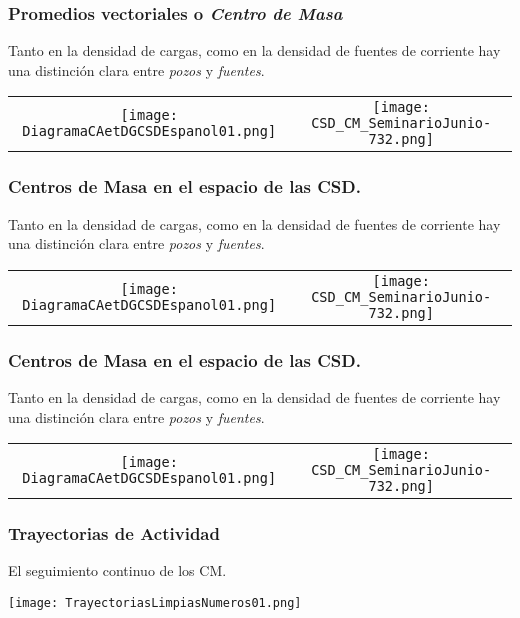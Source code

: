 \documentclass{beamer}
\begin{document}
\begin{frame}
\frametitle{Promedios vectoriales o \emph{Centro de Masa}} 
Tanto en la densidad de cargas, como en la densidad de fuentes de corriente
hay una distinción clara entre \emph{pozos} y \emph{fuentes}.
\begin{center}
  \begin{tabular}{cc}
    \texttt{[image: DiagramaCAetDGCSDEspanol01.png]}   &
    \texttt{[image: CSD\_CM\_SeminarioJunio-732.png]}
  \end{tabular}
\end{center}  
\end{frame}


\begin{frame}
\frametitle{Centros de Masa en el espacio de las CSD.} 
Tanto en la densidad de cargas, como en la densidad de fuentes de corriente
hay una distinción clara entre \emph{pozos} y \emph{fuentes}.
\begin{center}
  \begin{tabular}{cc}
    \texttt{[image: DiagramaCAetDGCSDEspanol01.png]}   &
    \texttt{[image: CSD\_CM\_SeminarioJunio-732.png]}
  \end{tabular}
\end{center}  
\end{frame}


\begin{frame}
\frametitle{Centros de Masa en el espacio de las CSD.} 
Tanto en la densidad de cargas, como en la densidad de fuentes de corriente
hay una distinción clara entre \emph{pozos} y \emph{fuentes}.
\begin{center}
  \begin{tabular}{cc}
    \texttt{[image: DiagramaCAetDGCSDEspanol01.png]}   &
    \texttt{[image: CSD\_CM\_SeminarioJunio-732.png]}
  \end{tabular}
\end{center}  
\end{frame}

\begin{frame}
\frametitle{Trayectorias de Actividad} 
El seguimiento continuo de los CM.
\begin{center}
    \texttt{[image: TrayectoriasLimpiasNumeros01.png]} 
\end{center}  
\end{frame}
\end{document}
